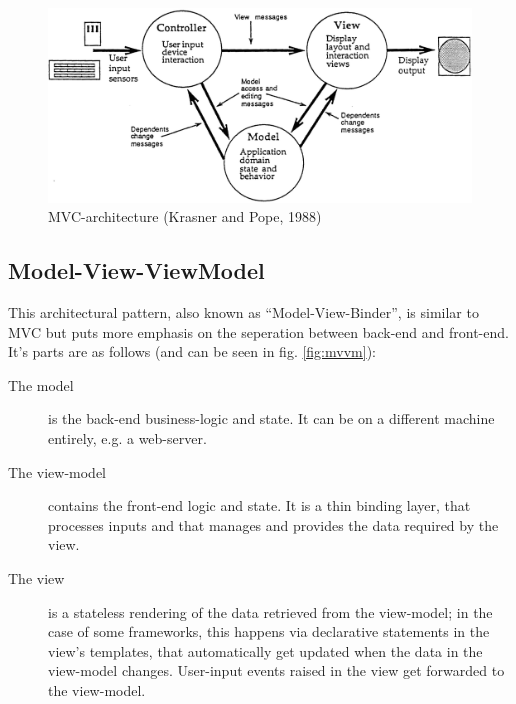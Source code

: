 \begin{figure}
\centering
\includegraphics[width=1.0\textwidth]{figures/mvc.png}
\caption[MVC-architecture]{MVC-architecture (Krasner and Pope, 1988)}
\label{fig:mvc}
\end{figure}

\subsection{Model-View-ViewModel}\label{ref:mvvm}

This architectural pattern, also known as ``Model-View-Binder'', is similar to MVC but puts more emphasis on the seperation between back-end and front-end. It's parts are as follows (and can be seen in fig. \ref{fig:mvvm}):

\begin{description}
  \item[The model] is the back-end business-logic and state. It can be on a different machine entirely, e.g. a web-server.
  \item[The view-model] contains the front-end logic and state. It is a thin binding layer, that processes inputs and that manages and provides the data required by the view.
  \item[The view] is a stateless rendering of the data retrieved from the view-model; in the case of some frameworks, this happens via declarative statements in the view's templates, that automatically get updated when the data in the view-model changes. User-input events raised in the view get forwarded to the view-model.
\end{description}


